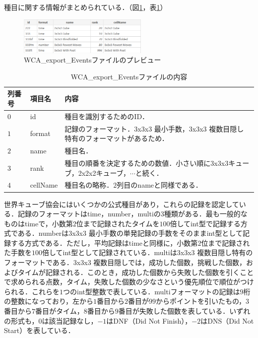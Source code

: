 \documentclass{article}
\begin{document}
  種目に関する情報がまとめられている．（図\ref{figure:events}，表\ref{table:events}）\par

  \begin{figure}[h]
    \centering
    \includegraphics[height=18mm]{events.png}
    \caption{WCA\_export\_Eventsファイルのプレビュー}
    \label{figure:events}
  \end{figure}

  \begin{table}[h]
    \centering
    \caption{WCA\_export\_Eventsファイルの内容}
    \label{table:events}
    \begin{tabular}{l|l|l}
      \hline
      列番号 & 項目名 & 内容 \\
      \hline \hline
      $ 0 $ & id & 種目を識別するためのID． \\
      $ 1 $ & format & 記録のフォーマット．3x3x3 最小手数，3x3x3 複数目隠し特有のフォーマットがあるため． \\
      $ 2 $ & name & 種目名． \\
      $ 3 $ & rank & 種目の順番を決定するための数値．小さい順に3x3x3キューブ，2x2x2キューブ，$ \cdots $と続く． \\
      $ 4 $ & cellName & 種目名の略称．$ 2 $列目のnameと同様である． \\
      \hline
    \end{tabular}
  \end{table}

  世界キューブ協会にはいくつかの公式種目があり，これらの記録を認定している．記録のフォーマットはtime，number，multiの$ 3 $種類がある．最も一般的なものはtimeで，小数第$ 2 $位まで記録されたタイムを$ 100 $倍してint型で記録する方式である．numberは3x3x3 最小手数の単発記録の手数をそのままint型として記録する方式である．ただし，平均記録はtimeと同様に，小数第$ 2 $位まで記録された手数を$ 100 $倍してint型として記録されている．multiは3x3x3 複数目隠し特有のフォーマットである．3x3x3 複数目隠しでは，成功した個数，挑戦した個数，およびタイムが記録される．このとき，成功した個数から失敗した個数を引くことで求められる点数，タイム，失敗した個数の少なさという優先順位で順位がつけられる．これらを$ 1 $つのint型整数で表している．multiフォーマットの記録は$ 9 $桁の整数になっており，左から$ 1 $番目から$ 2 $番目が$ 99 $からポイントを引いたもの，$ 3 $番目から$ 7 $番目がタイム，$ 8 $番目から$ 9 $番目が失敗した個数を表している．いずれの形式も，$ 0 $は該当記録なし，$ -1 $はDNF（Did Not Finish），$ -2 $はDNS（Did Not Start）を表している．\par
\end{document}
